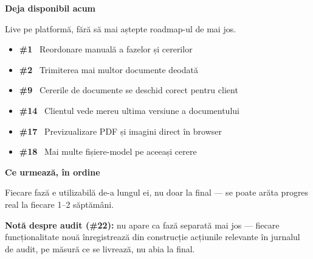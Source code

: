 \documentclass[10pt,a4paper]{article}
\newcommand{\rn}[1]{\textbf{\footnotesize\color{Blue}#1}~}
\begin{document}
{\fontsize{13}{16}\selectfont\bfseries\color{Navy}Deja disponibil acum}\par
\vspace{1mm}
{\footnotesize\color{Muted}Live pe platformă, fără să mai aștepte roadmap-ul de mai jos.}\par
\vspace{1.5mm}

\begin{donebox}
\begin{itemize}[label={\color{Green}},leftmargin=5.5mm]
\item \rn{\#1} Reordonare manuală a fazelor și cererilor
\item \rn{\#2} Trimiterea mai multor documente deodată
\item \rn{\#9} Cererile de documente se deschid corect pentru client
\item \rn{\#14} Clientul vede mereu ultima versiune a documentului
\item \rn{\#17} Previzualizare PDF și imagini direct în browser
\item \rn{\#18} Mai multe fișiere-model pe aceeași cerere
\end{itemize}
\end{donebox}

\vspace{4mm}
{\fontsize{13}{16}\selectfont\bfseries\color{Navy}Ce urmează, în ordine}\par
\vspace{1mm}
{\footnotesize\color{Muted}Fiecare fază e utilizabilă de-a lungul ei, nu doar la final — se poate arăta progres real la fiecare 1–2 săptămâni.}\par
\vspace{1.5mm}

\begin{notebox}
\textbf{\color{Blue}Notă despre audit (\#22):} nu apare ca fază separată mai jos — fiecare funcționalitate nouă înregistrează din construcție acțiunile relevante în jurnalul de audit, pe măsură ce se livrează, nu abia la final.
\end{notebox}
\end{document}
